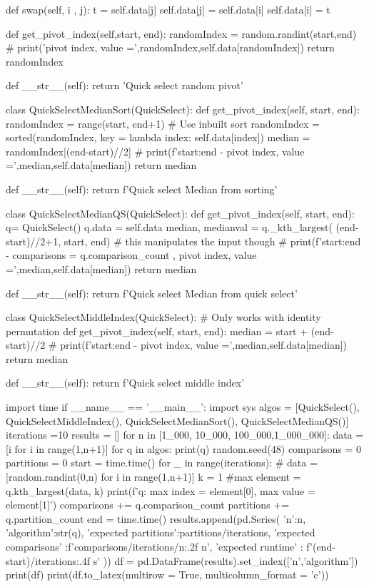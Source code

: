 \documentclass{homeworg}
\begin{document}
\begin{python}
    def swap(self, i , j):
        t = self.data[j]
        self.data[j] = self.data[i]
        self.data[i] = t

    def get_pivot_index(self,start, end):
        randomIndex = random.randint(start,end)
        # print('pivot index, value =',randomIndex,self.data[randomIndex])
        return randomIndex

    def __str__(self):
        return 'Quick select random pivot'

class QuickSelectMedianSort(QuickSelect):
    def get_pivot_index(self, start, end):
        randomIndex = range(start, end+1)
        # Use inbuilt sort
        randomIndex = sorted(randomIndex, key = lambda index: self.data[index])
        median = randomIndex[(end-start)//2]
        # print(f'{start}:{end} - pivot index, value =',median,self.data[median])
        return median

    def __str__(self):
        return f'Quick select Median from sorting'

class QuickSelectMedianQS(QuickSelect):
    def get_pivot_index(self, start, end):
        q= QuickSelect()
        q.data = self.data
        median, medianval = q._kth_largest( (end-start)//2+1, start, end) # this manipulates the input though
        # print(f'{start}:{end} - comparisons = {q.comparison_count} , pivot index, value =',median,self.data[median])
        return median

    def __str__(self):
        return f'Quick select Median from quick select'

class QuickSelectMiddleIndex(QuickSelect):
    # Only works with identity permutation
    def get_pivot_index(self, start, end):
        median = start + (end-start)//2
        # print(f'{start}:{end} - pivot index, value =',median,self.data[median])
        return median

    def __str__(self):
        return f'Quick select middle index'

import time
if __name__ == '__main__':
    import sys
    algos = [QuickSelect(), QuickSelectMiddleIndex(), QuickSelectMedianSort(), QuickSelectMedianQS()]
    iterations  =10
    results = []
    for n in [1_000, 10_000, 100_000,1_000_000]:
        data = [i for i in range(1,n+1)]
        for q in algos:
            print(q)
            random.seed(48)
            comparisons = 0
            partitions = 0
            start = time.time()
            for _ in range(iterations):
                # data = [random.randint(0,n) for i in range(1,n+1)]
                k = 1 #max
                element = q.kth_largest(data, k)
                print(f'q: max index =  {element[0]}, max value = {element[1]}')
                comparisons += q.comparison_count
                partitions += q.partition_count
            end = time.time()
            results.append(pd.Series({
                'n':n,
                'algorithm':str(q),
                'expected partitions':partitions/iterations,
                'expected comparisons' :f'{comparisons/iterations/n:.2f} n',
                'expected runtime' : f'{(end-start)/iterations:.4f} s'
            }))
    df = pd.DataFrame(results).set_index(['n','algorithm'])
    print(df)
    print(df.to_latex(multirow = True, multicolumn_format = 'c'))


\end{python}
\end{document}
